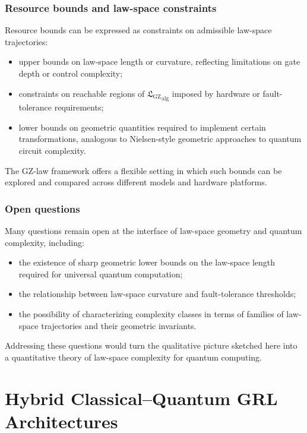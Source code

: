 \documentclass[11pt]{book}
\newcommand{\GZLS}{\ensuremath{\mathfrak{L}_{\mathrm{GZ}}}}
\theoremstyle{plain}
\theoremstyle{definition}
\theoremstyle{remark}
\begin{document}
\subsection*{Resource bounds and law-space constraints}

Resource bounds can be expressed as constraints on admissible
law-space trajectories:
\begin{itemize}
  \item upper bounds on law-space length or curvature, reflecting
        limitations on gate depth or control complexity;
  \item constraints on reachable regions of ${\GZLS}_{\mathrm{alg}}$
        imposed by hardware or fault-tolerance requirements;
  \item lower bounds on geometric quantities required to implement
        certain transformations, analogous to Nielsen-style
        geometric approaches to quantum circuit complexity.
\end{itemize}

The GZ-law framework offers a flexible setting in which such bounds
can be explored and compared across different models and hardware
platforms.

\subsection*{Open questions}

Many questions remain open at the interface of law-space geometry
and quantum complexity, including:
\begin{itemize}
  \item the existence of sharp geometric lower bounds on the
        law-space length required for universal quantum computation;
  \item the relationship between law-space curvature and
        fault-tolerance thresholds;
  \item the possibility of characterizing complexity classes in
        terms of families of law-space trajectories and their
        geometric invariants.
\end{itemize}

Addressing these questions would turn the qualitative picture
sketched here into a quantitative theory of law-space complexity for
quantum computing.



\chapter[Hybrid Classical–Quantum GRL Architectures]{Hybrid Classical–Quantum GRL Architectures}
\label{chap:hybrid-cq-grl}
\end{document}
